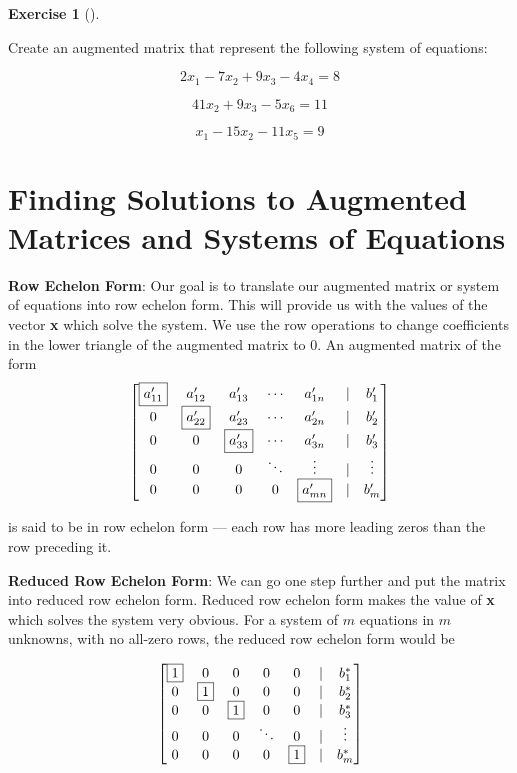 \documentclass[
  letterpaper,
]{book}
\theoremstyle{definition}
\theoremstyle{definition}
\theoremstyle{plain}
\theoremstyle{definition}
\newtheorem{exercise}{Exercise}[chapter]
\theoremstyle{plain}
\theoremstyle{plain}
\theoremstyle{remark}
\begin{document}
\leavevmode{}%
\begin{exercise}[]\label{exr-augmatrix}

Create an augmented matrix that represent the following system of
equations:

\[2x_1 -7x_2 + 9x_3 -4x_4 = 8\]

\[41x_2 + 9x_3 -5x_6 = 11\]

\[x_1 -15x_2 -11x_5 = 9\]

\end{exercise}

\hypertarget{finding-solutions-to-augmented-matrices-and-systems-of-equations}{%
\section{Finding Solutions to Augmented Matrices and Systems of
Equations}\label{finding-solutions-to-augmented-matrices-and-systems-of-equations}}

\textbf{Row Echelon Form}: Our goal is to translate our augmented matrix
or system of equations into row echelon form. This will provide us with
the values of the vector \textbf{x} which solve the system. We use the
row operations to change coefficients in the lower triangle of the
augmented matrix to 0. An augmented matrix of the form \[\begin{bmatrix}
    \fbox{$a'_{11}$}& a'_{12} & a'_{13}& \cdots & a'_{1n} & | & b'_1\\
    0 & \fbox{$a'_{22}$} & a'_{23}& \cdots & a'_{2n} & | & b'_2\\
    0 & 0 & \fbox{$a'_{33}$}& \cdots & a'_{3n} & | & b'_3\\
    0 & 0 &0 & \ddots & \vdots  & | & \vdots \\
    0 & 0 &0 &0 & \fbox{$a'_{mn}$} & | & b'_m
    \end{bmatrix}\]

is said to be in row echelon form --- each row has more leading zeros
than the row preceding it.

\textbf{Reduced Row Echelon Form}: We can go one step further and put
the matrix into reduced row echelon form. Reduced row echelon form makes
the value of \textbf{x} which solves the system very obvious. For a
system of \(m\) equations in \(m\) unknowns, with no all-zero rows, the
reduced row echelon form would be

\[\begin{bmatrix}
    \fbox{$1$}  &  0 &   0 &    0  &   0 & | & b^*_1\\
    0  &  \fbox{$1$} &   0 &    0  &   0 & | & b^*_2\\
    0  &  0 &   \fbox{$1$} &    0  &   0 & | & b^*_3\\
    0  &  0 &   0 &\ddots &   0 & | &\vdots\\
    0  &  0 &   0 &    0  &   \fbox{$1$} & | & b^*_m
    \end{bmatrix}\]
\end{document}
